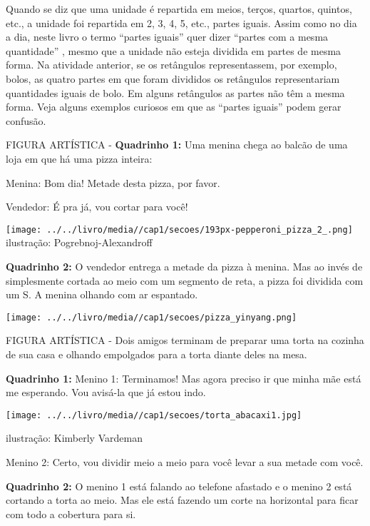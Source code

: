 \documentclass[a4,12pt]{book}
\begin{document}
\begin{refletindo*}[breakable]{}{}  
  Quando se diz que uma unidade é repartida em meios, terços, quartos, quintos, etc., a unidade foi repartida em 2, 3, 4, 5, etc., partes iguais.  
  Assim como no dia a dia, neste livro o termo   ``partes iguais''   quer dizer   ``partes com a mesma quantidade''  , mesmo que a unidade não esteja dividida em partes de mesma forma.  
  Na atividade anterior, se os retângulos representassem, por exemplo, bolos, as quatro partes em que foram divididos os retângulos representariam quantidades iguais de bolo.   
  Em alguns retângulos as partes não têm a mesma forma.  
  Veja alguns exemplos curiosos em que as   ``partes iguais''   podem gerar confusão.  
  
  \begin{imagem*}[breakable]{}{}     FIGURA ARTÍSTICA    -   
    {\bf Quadrinho 1:}     Uma menina chega ao balcão de uma loja em que há uma pizza inteira:     
    
    Menina: Bom dia! Metade desta pizza, por favor.     
    
    Vendedor: É pra já, vou cortar para você!    
    
        \texttt{[image: ../../livro/media//cap1/secoes/193px-pepperoni\_pizza\_2\_.png]}    
    ilustração: Pogrebnoj-Alexandroff    
    
    {\bf Quadrinho 2:}     O vendedor entrega a metade da pizza à menina. Mas ao invés de simplesmente cortada ao meio com um segmento de reta, a pizza foi dividida com um S. A menina olhando com ar espantado.     
    
        \texttt{[image: ../../livro/media//cap1/secoes/pizza\_yinyang.png]}    
  \end{imagem*}  
  
  \begin{imagem*}[breakable]{}{}     FIGURA ARTÍSTICA   -     Dois amigos terminam de preparar uma torta na cozinha de sua casa e olhando empolgados para a torta diante deles na mesa.    
    
    {\bf Quadrinho 1:}  Menino 1:  Terminamos! Mas agora preciso ir que minha mãe está me esperando. Vou avisá-la que já estou indo.    
    
        \texttt{[image: ../../livro/media//cap1/secoes/torta\_abacaxi1.jpg]}    
    
    ilustração: Kimberly Vardeman    
    
    Menino 2: Certo, vou dividir meio a meio para você levar a sua metade com você.    
    
    {\bf Quadrinho 2:}    
    O menino 1 está falando ao telefone afastado e o menino 2 está cortando a torta ao meio. Mas ele está fazendo um corte na horizontal para ficar com todo a cobertura para si.    
  \end{imagem*}  
\end{refletindo*}
\end{document}
